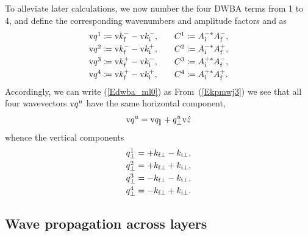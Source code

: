 To alleviate later calculations,
we now number the four DWBA terms from 1 to 4,
and define the corresponding wavenumbers and amplitude factors and as
\begin{equation}
  \begin{array}{l@{\hspace{2em}}l}
    \q^1 \coloneqq  \k^-_\tf - \k^-_\ti,& C^1 \coloneqq  A^{-*}_\ti A^-_\tf, \\[.6ex]
    \q^2 \coloneqq  \k^-_\tf - \k^+_\ti,& C^2 \coloneqq  A^{-*}_\ti A^+_\tf, \\[.6ex]
    \q^3 \coloneqq  \k^+_\tf - \k^-_\ti,& C^3 \coloneqq  A^{+*}_\ti A^-_\tf, \\[.6ex]
    \q^4 \coloneqq  \k^+_\tf - \k^+_\ti,& C^4 \coloneqq  A^{+*}_\ti A^+_\tf.
  \end{array}
\end{equation}
Accordingly, we can write (\ref{Edwba_ml0}) as
From~(\ref{Ekpmwj3}) we see that all four wavevectors $\text{v}{q}^u$
have the same horizontal component,
\begin{equation}\label{Eqpp}
  \text{v}{q}^u = \text{v}{q}_\parallel + q^u_\perp \text{v}{\hat z}
\end{equation}
whence the vertical components
\begin{equation}
    \begin{array}{l}
  q^1_\perp = +k_{\text{f}\perp  } -k_{\text{i}\perp},\\[.6ex]
  q^2_\perp = +k_{\text{f}\perp  } +k_{\text{i}\perp},\\[.6ex]
  q^3_\perp = -k_{\text{f}\perp  } -k_{\text{i}\perp},\\[.6ex]
  q^4_\perp = -k_{\text{f}\perp  } +k_{\text{i}\perp}.
    \end{array}
\end{equation}

\subsection{Wave propagation across layers}\label{Sacrolay}

%
%
%

